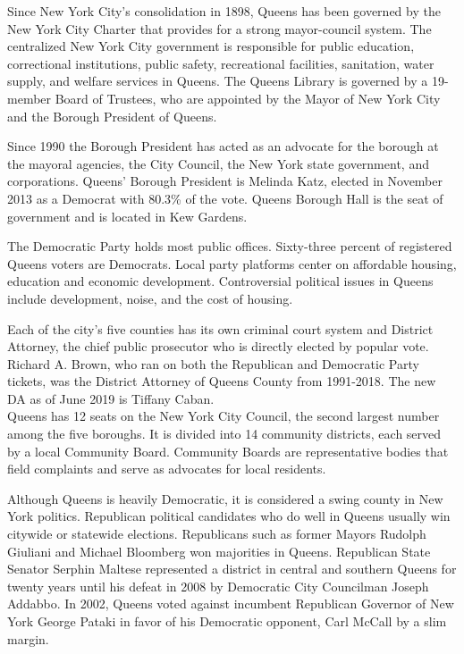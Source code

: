 Since New York City's consolidation in 1898, Queens has been governed by
the New York City Charter that provides for a strong mayor-council
system. The centralized New York City government is responsible for
public education, correctional institutions, public safety, recreational
facilities, sanitation, water supply, and welfare services in Queens.
The Queens Library is governed by a 19-member Board of Trustees, who are
appointed by the Mayor of New York City and the Borough President of
Queens.

Since 1990 the Borough President has acted as an advocate for the
borough at the mayoral agencies, the City Council, the New York state
government, and corporations. Queens' Borough President is Melinda Katz,
elected in November 2013 as a Democrat with 80.3\% of the vote. Queens
Borough Hall is the seat of government and is located in Kew Gardens.

The Democratic Party holds most public offices. Sixty-three percent of
registered Queens voters are Democrats. Local party platforms center on
affordable housing, education and economic development. Controversial
political issues in Queens include development, noise, and the cost of
housing.

Each of the city's five counties has its own criminal court system and
District Attorney, the chief public prosecutor who is directly elected
by popular vote. Richard A. Brown, who ran on both the Republican and
Democratic Party tickets, was the District Attorney of Queens County
from 1991-2018. The new DA as of June 2019 is Tiffany Caban.\\
Queens has 12 seats on the New York City Council, the second largest
number among the five boroughs. It is divided into 14 community
districts, each served by a local Community Board. Community Boards are
representative bodies that field complaints and serve as advocates for
local residents.

Although Queens is heavily Democratic, it is considered a swing county
in New York politics. Republican political candidates who do well in
Queens usually win citywide or statewide elections. Republicans such as
former Mayors Rudolph Giuliani and Michael Bloomberg won majorities in
Queens. Republican State Senator Serphin Maltese represented a district
in central and southern Queens for twenty years until his defeat in 2008
by Democratic City Councilman Joseph Addabbo. In 2002, Queens voted
against incumbent Republican Governor of New York George Pataki in favor
of his Democratic opponent, Carl McCall by a slim margin.

